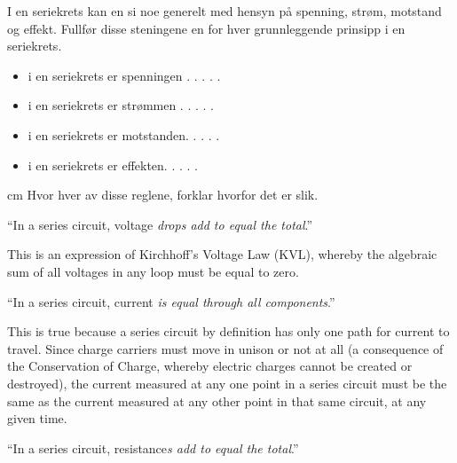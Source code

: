 

I en seriekrets kan en si noe generelt med hensyn på spenning, strøm, motstand og effekt. Fullfør disse steningene en for hver grunnleggende prinsipp i en seriekrets. 

\vskip 10pt


\begin{itemize}
\item i en seriekrets er spenningen . . . . . 
\item i en seriekrets er strømmen . . . . . 
\item i en seriekrets er motstanden. . . . . 
\item i en seriekrets er effekten. . . . . 

\end{itemize}
 cm
Hvor hver av disse reglene, forklar hvorfor det er slik. 







\noindent
``In a series circuit, voltage {\it drops add to equal the total}.''

\vskip 10pt

This is an expression of Kirchhoff's Voltage Law (KVL), whereby the algebraic sum of all voltages in any loop must be equal to zero.




\vskip 30pt

\noindent
``In a series circuit, current {\it is equal through all components}.''

\vskip 10pt

This is true because a series circuit by definition has only one path for current to travel.  Since charge carriers must move in unison or not at all (a consequence of the Conservation of Charge, whereby electric charges cannot be created or destroyed), the current measured at any one point in a series circuit must be the same as the current measured at any other point in that same circuit, at any given time.



\vskip 30pt

\noindent
``In a series circuit, resistance{\it s add to equal the total}.''

